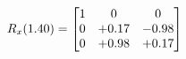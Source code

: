 \documentclass[preview]{standalone}
\begin{document}
\begin{align*}
\special{dvisvgm:raw <g id='unique000'>}R_{x}(1.40) = \begin{bmatrix}1 & 0 & 0 \\0 & +0.17 & -0.98 \\0 & +0.98 & +0.17\end{bmatrix}\special{dvisvgm:raw </g>}
\end{align*}
\end{document}
